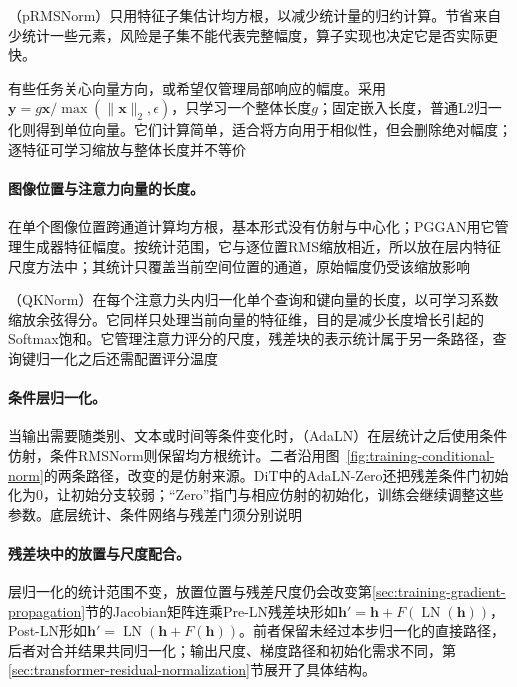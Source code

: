 （pRMSNorm）只用特征子集估计均方根，以减少统计量的归约计算。节省来自少统计一些元素，风险是子集不能代表完整幅度，算子实现也决定它是否实际更快。

有些任务关心向量方向，或希望仅管理局部响应的幅度。采用$\bm y=g\bm x/\max(\lVert\bm x\rVert_2,\epsilon)$，只学习一个整体长度$g$；固定嵌入长度，普通L2归一化则得到单位向量。它们计算简单，适合将方向用于相似性，但会删除绝对幅度；逐特征可学习缩放与整体长度并不等价

\paragraph{图像位置与注意力向量的长度。}

在单个图像位置跨通道计算均方根，基本形式没有仿射与中心化；PGGAN用它管理生成器特征幅度。按统计范围，它与逐位置RMS缩放相近，所以放在层内特征尺度方法中；其统计只覆盖当前空间位置的通道，原始幅度仍受该缩放影响

（QKNorm）在每个注意力头内归一化单个查询和键向量的长度，以可学习系数缩放余弦得分。它同样只处理当前向量的特征维，目的是减少长度增长引起的Softmax饱和。它管理注意力评分的尺度，残差块的表示统计属于另一条路径，查询键归一化之后还需配置评分温度

\paragraph{条件层归一化。}

当输出需要随类别、文本或时间等条件变化时，（AdaLN）在层统计之后使用条件仿射，条件RMSNorm则保留均方根统计。二者沿用图~\ref{fig:training-conditional-norm}的两条路径，改变的是仿射来源。DiT中的AdaLN-Zero还把残差条件门初始化为0，让初始分支较弱；“Zero”指门与相应仿射的初始化，训练会继续调整这些参数。底层统计、条件网络与残差门须分别说明

\paragraph{残差块中的放置与尺度配合。}

层归一化的统计范围不变，放置位置与残差尺度仍会改变第\ref{sec:training-gradient-propagation}节的Jacobian矩阵连乘Pre-LN残差块形如$\bm h'=\bm h+F(\operatorname{LN}(\bm h))$，Post-LN形如$\bm h'=\operatorname{LN}(\bm h+F(\bm h))$。前者保留未经过本步归一化的直接路径，后者对合并结果共同归一化；输出尺度、梯度路径和初始化需求不同，第\ref{sec:transformer-residual-normalization}节展开了具体结构。


